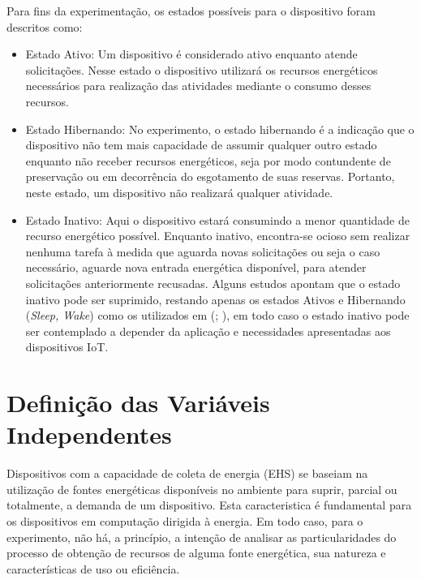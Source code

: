 Para fins da experimentação, os estados possíveis para o dispositivo foram descritos como:
\begin{itemize}

	\item Estado Ativo: Um dispositivo é considerado ativo enquanto atende solicitações. Nesse estado o dispositivo utilizará os recursos energéticos necessários para realização das atividades mediante o consumo desses recursos. 
	
		\item Estado Hibernando: No experimento, o estado hibernando é a indicação que o dispositivo não tem mais capacidade de assumir qualquer outro estado enquanto não receber recursos energéticos, seja por modo contundente de preservação ou em decorrência do esgotamento de suas reservas. Portanto, neste estado, um dispositivo não realizará qualquer atividade.

	\item Estado Inativo: Aqui o dispositivo estará consumindo a menor quantidade de recurso energético possível. Enquanto inativo, encontra-se ocioso sem realizar nenhuma tarefa à medida que aguarda novas solicitações ou seja o caso necessário, aguarde nova entrada energética disponível, para atender solicitações anteriormente recusadas. Alguns estudos apontam que o estado inativo pode ser suprimido, restando apenas os estados Ativos e Hibernando (\textit{Sleep, Wake}) como os utilizados em (; ), em todo caso o estado inativo pode ser contemplado a depender da aplicação e necessidades apresentadas aos dispositivos \acs{IoT}.
	
	
	
	
\end{itemize}




\section{Definição das Variáveis Independentes}
\label{cap6:variaveisdispositivos}
Dispositivos com a capacidade de coleta de energia (\acl{EHS}) se baseiam na utilização de fontes energéticas disponíveis no ambiente para suprir, parcial ou totalmente, a demanda de um dispositivo. Esta caracteristica é fundamental para os dispositivos em computação dirigida à energia. Em todo caso, para o experimento, não há, a princípio, a intenção de analisar as particularidades do processo de obtenção de recursos de alguma fonte energética, sua natureza e características de uso ou eficiência. 

